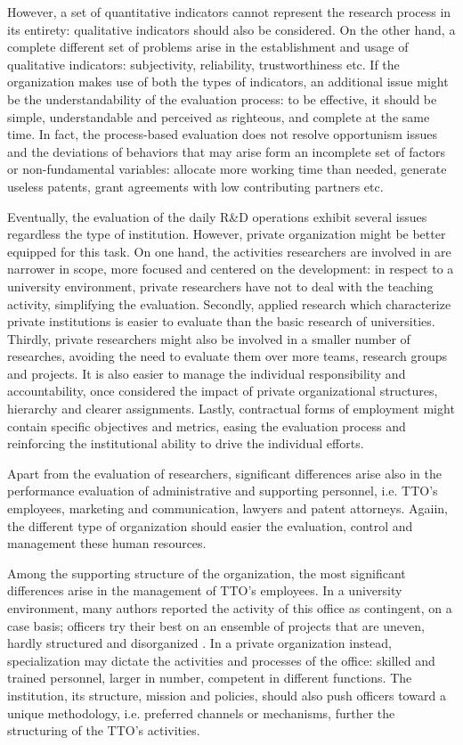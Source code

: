 However, a set of quantitative indicators cannot represent the research process in its entirety: qualitative indicators should also be considered. On the other hand, a complete different set of problems arise in the establishment and usage of qualitative indicators: subjectivity, reliability, trustworthiness etc. If the organization makes use of both the types of indicators, an additional issue might be the understandability of the evaluation process: to be effective, it should be simple, understandable and perceived as righteous, and complete at the same time. In fact, the process-based evaluation does not resolve opportunism issues and the deviations of behaviors that may arise form an incomplete set of factors or non-fundamental variables: allocate more working time than needed, generate useless patents, grant agreements with low contributing partners etc. 

Eventually, the evaluation of the daily R\&D operations exhibit several issues regardless the type of institution. However, private organization might be better equipped for this task. On one hand, the activities researchers are involved in are narrower in scope, more focused and centered on the development: in respect to a university environment, private researchers have not to deal with the teaching activity, simplifying the evaluation. Secondly, applied research which characterize private institutions is easier to evaluate than the basic research of universities. Thirdly, private researchers might also be involved in a smaller number of researches, avoiding the need to evaluate them over more teams, research groups and projects. It is also easier to manage the individual responsibility and accountability, once considered the impact of private organizational structures, hierarchy and clearer assignments. Lastly, contractual forms of employment might contain specific objectives and metrics, easing the evaluation process and reinforcing the institutional ability to drive the individual efforts. 

Apart from the evaluation of researchers, significant differences arise also in the performance evaluation of administrative and supporting personnel, i.e. TTO's employees, marketing and communication, lawyers and patent attorneys. Agaiin, the different type of organization should easier the evaluation, control and management these human resources.

Among the supporting structure of the organization, the most significant differences arise in the management of TTO's employees. In a university environment, many authors reported the activity of this office as contingent, on a case basis; officers try their best on an ensemble of projects that are uneven, hardly structured and disorganized \citep{Jensen2003}. In a private organization instead, specialization may dictate the activities and processes of the office: skilled and trained personnel, larger in number, competent in different functions. The institution, its structure, mission and policies, should also push officers toward a unique methodology, i.e. preferred channels or mechanisms, further the structuring of the TTO's activities. 

